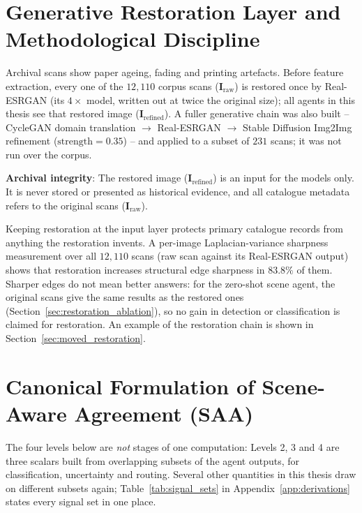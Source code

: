 \documentclass[12pt,a4paper]{report}
\begin{document}
\section{Generative Restoration Layer and Methodological Discipline}
Archival scans show paper ageing, fading and printing artefacts. Before feature extraction, every one of the $12{,}110$ corpus scans ($\mathbf{I}_{\text{raw}}$) is restored once by Real-ESRGAN \cite{realesrgan2021} (its $4\times$ model, written out at twice the original size); all agents in this thesis see that restored image ($\mathbf{I}_{\text{refined}}$). A fuller generative chain was also built -- CycleGAN domain translation \cite{cyclegan2017} $\rightarrow$ Real-ESRGAN $\rightarrow$ Stable Diffusion Img2Img refinement \cite{stable_diffusion2022} ($\text{strength}=0.35$) -- and applied to a subset of $231$ scans; it was not run over the corpus.

\begin{flushleft}
\textbf{Archival integrity}: The restored image ($\mathbf{I}_{\text{refined}}$) is an input for the models only. It is never stored or presented as historical evidence, and all catalogue metadata refers to the original scans ($\mathbf{I}_{\text{raw}}$).
\end{flushleft}

Keeping restoration at the input layer protects primary catalogue records from anything the restoration invents. A per-image Laplacian-variance sharpness measurement over all $12{,}110$ scans (raw scan against its Real-ESRGAN output) shows that restoration increases structural edge sharpness in $83.8\%$ of them. Sharper edges do not mean better answers: for the zero-shot scene agent, the original scans give the same results as the restored ones (Section~\ref{sec:restoration_ablation}), so no gain in detection or classification is claimed for restoration. An example of the restoration chain is shown in Section~\ref{sec:moved_restoration}.


\section{Canonical Formulation of Scene-Aware Agreement (SAA)}
\label{sec:canonical_saa}
The four levels below are \emph{not} stages of one computation: Levels 2, 3 and 4 are three scalars built from overlapping subsets of the agent outputs, for classification, uncertainty and routing. Several other quantities in this thesis draw on different subsets again; Table~\ref{tab:signal_sets} in Appendix~\ref{app:derivations} states every signal set in one place.
\end{document}
